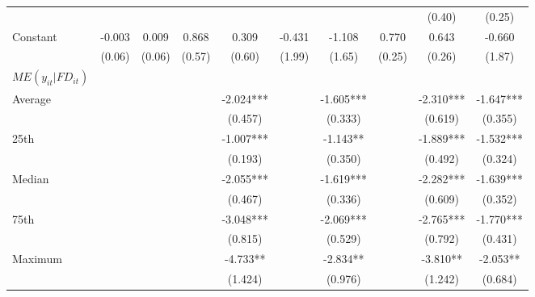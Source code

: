 \documentclass[12pt, a4paper]{article}
\begin{document}
\begin{table}[htbp]
\begin{threeparttable}
{\begin{tabular}{l*{9}{c}}
				&                     &                     &                     &                     &                     &                     &                     &      (0.40)         &      (0.25)         \\
				Constant            &      -0.003         &       0.009         &       0.868         &       0.309         &      -0.431         &      -1.108         &       0.770\sym{**} &       0.643\sym{*}  &      -0.660         \\
				&      (0.06)         &      (0.06)         &      (0.57)         &      (0.60)         &      (1.99)         &      (1.65)         &      (0.25)         &      (0.26)         &      (1.87)         \\
				\hline
				$ME(y_{it}|FD_{it})$ \\
				Average&&&&	-2.024***	&&	-1.605***	&&	-2.310***	&	-1.647***\\
				&&&&(0.457)   &&		(0.333)   	&&	(0.619)   &		(0.355)   \\
				
				25th&&&&	-1.007***	&&	-1.143** 	&&	-1.889***	&	-1.532***\\
				&&&&(0.193)   &&		(0.350)   	&&	(0.492)   &		(0.324)   \\
				
				Median&&&&	-2.055***	&&	-1.619***	&&	-2.282***	&	-1.639***\\
				&&&&(0.467)  &&		(0.336)   &&		(0.609)   	&	(0.352)   \\
				
				75th&&&&	-3.048***	&&	-2.069***	&&	-2.765***	&	-1.770***\\
				&&&&(0.815)  && 		(0.529)   	&&	(0.792)   	&	(0.431)   \\
				
				Maximum&&&&	-4.733** &&		-2.834** 	&&	-3.810** &		-2.053** \\
				&&&&(1.424)   	&&	(0.976)  &&		(1.242)   &		(0.684)   \\
				

\end{tabular}}
\end{threeparttable}
\end{table}
\end{document}
